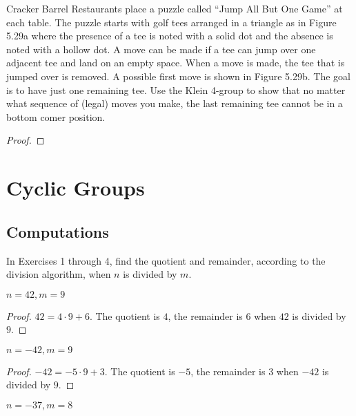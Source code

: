 \begin{exercise}
    Cracker Barrel Restaurants place a puzzle called ``Jump All But One Game'' at each table. The puzzle starts with golf tees arranged in a triangle as in Figure 5.29a where the presence of a tee is noted with a solid dot and the absence is noted with a hollow dot. A move can be made if a tee can jump over one adjacent tee and land on an empty space. When a move is made, the tee that is jumped over is removed. A possible first move is shown in Figure 5.29b. The goal is to have just one remaining tee. Use the Klein 4-group to show that no matter what sequence of (legal) moves you make, the last remaining tee cannot be in a bottom comer position.
\end{exercise}

\begin{proof}
\end{proof}

\section{Cyclic Groups}

\subsection*{Computations}

In Exercises 1 through 4, find the quotient and remainder, according to the division algorithm, when $n$ is divided by $m$.

\begin{exercise}
    $n = 42, m = 9$
\end{exercise}

\begin{proof}
    $42 = 4\cdot 9 + 6$. The quotient is $4$, the remainder is $6$ when $42$ is divided by $9$.
\end{proof}

\begin{exercise}
    $n = -42, m = 9$
\end{exercise}

\begin{proof}
    $-42 = -5 \cdot 9 + 3$. The quotient is $-5$, the remainder is $3$ when $-42$ is divided by $9$.
\end{proof}

\begin{exercise}
    $n = -37, m = 8$
\end{exercise}

